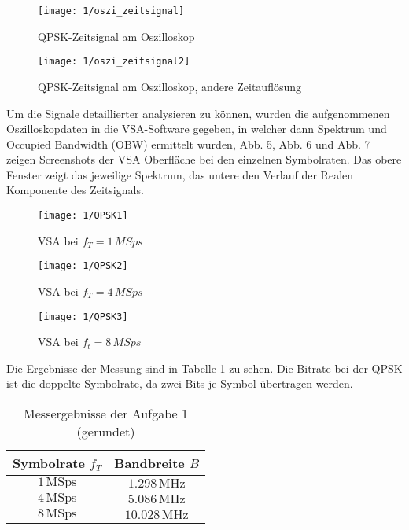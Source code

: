 \documentclass[a4paper, 12pt]{article}
\begin{document}
  \begin{figure}[H]
    \begin{center}
      \texttt{[image: 1/oszi\_zeitsignal]}
    \end{center}
    \caption{QPSK-Zeitsignal am Oszilloskop}
  \end{figure}

  \begin{figure}[H]
    \begin{center}
      \texttt{[image: 1/oszi\_zeitsignal2]}
    \end{center}
    \caption{QPSK-Zeitsignal am Oszilloskop, andere Zeitauflösung}
  \end{figure}

  Um die Signale detaillierter analysieren zu können, wurden die aufgenommenen
  Oszilloskopdaten in die VSA-Software gegeben, in welcher dann Spektrum und
  Occupied Bandwidth (OBW) ermittelt wurden, Abb. 5, Abb. 6 und Abb. 7 zeigen
  Screenshots der VSA Oberfläche bei den einzelnen Symbolraten. Das obere
  Fenster zeigt das jeweilige Spektrum, das untere den Verlauf der Realen
  Komponente des Zeitsignals.
  
    \begin{figure}[H]
    \begin{center}
      \texttt{[image: 1/QPSK1]}
    \end{center}
    \caption{VSA bei $f_T = 1 \, \si{MSps}$}
  \end{figure}
    \begin{figure}[H]
    \begin{center}
      \texttt{[image: 1/QPSK2]}
    \end{center}
    \caption{VSA bei $f_T = 4 \, \si{MSps}$}
  \end{figure}
    \begin{figure}[H]
    \begin{center}
      \texttt{[image: 1/QPSK3]}
    \end{center}
    \caption{VSA bei $f_t = 8 \, \si{MSps}$}
  \end{figure}

Die Ergebnisse der Messung sind in Tabelle 1 zu sehen.
  Die Bitrate bei der QPSK ist die doppelte Symbolrate, da zwei Bits je Symbol übertragen werden. 


  \begin{table}[H]
  \begin{center}
    \begin{tabular}{c | c }
      Symbolrate $f_T$ & Bandbreite $B$\\
      \hline
      $1 \, \textrm{MSps}$ & $1.298 \, \si{\mega\hertz}$\\
      $4 \, \textrm{MSps}$ & $5.086 \, \si{\mega\hertz}$\\
      $8 \, \textrm{MSps}$ & $10.028 \, \si{\mega\hertz}$
    \end{tabular}
    \caption{Messergebnisse der Aufgabe 1 (gerundet)}
  \end{center}
  \end{table}
\end{document}
